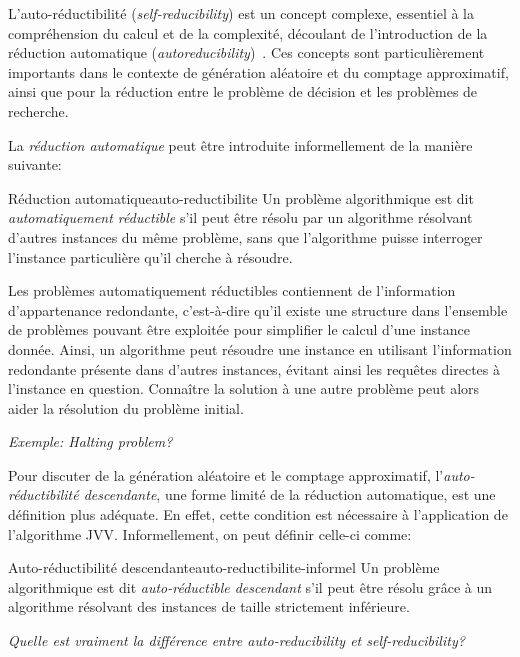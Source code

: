 L'auto-réductibilité (\textit{self-reducibility}) est un concept complexe, essentiel à la compréhension du calcul et de la complexité, découlant de l'introduction de la réduction automatique (\textit{autoreducibility})~\cite{trakhtenbrotAutoreducibility1970}. Ces concepts sont particulièrement importants dans le contexte de génération aléatoire et du comptage approximatif, ainsi que pour la réduction entre le problème de décision et les problèmes de recherche.

La \textit{réduction automatique} peut être introduite informellement de la manière suivante:

\begin{subdefinition}{Réduction automatique}{auto-reductibilite}
    Un problème algorithmique est dit \textit{automatiquement réductible} s'il peut être résolu par un algorithme résolvant d'autres instances du même problème, sans que l'algorithme puisse interroger l'instance particulière qu'il cherche à résoudre.
\end{subdefinition}

Les problèmes automatiquement réductibles contiennent de l'information d'appartenance redondante, c'est-à-dire qu'il existe une structure dans l'ensemble de problèmes pouvant être exploitée pour simplifier le calcul d'une instance donnée. Ainsi, un algorithme peut résoudre une instance en utilisant l'information redondante présente dans d'autres instances, évitant ainsi les requêtes directes à l'instance en question. Connaître la solution à une autre problème peut alors aider la résolution du problème initial. 

\textcolor{mydarkred}{\textit{Exemple: Halting problem?}}

Pour discuter de la génération aléatoire et le comptage approximatif, l'\textit{auto-réductibilité descendante}, une forme limité de la réduction automatique, est une définition plus adéquate. En effet, cette condition est nécessaire à l'application de l'algorithme JVV. Informellement, on peut définir celle-ci comme:

\begin{maindefinition}{Auto-réductibilité descendante}{auto-reductibilite-informel}
    Un problème algorithmique est dit \textit{auto-réductible descendant} s'il peut être résolu grâce à un algorithme résolvant des instances de taille strictement inférieure.
\end{maindefinition}

\textcolor{mydarkred}{\textit{Quelle est vraiment la différence entre auto-reducibility et self-reducibility?}}


